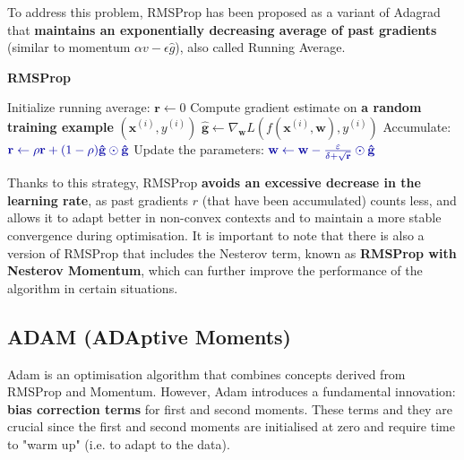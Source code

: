 To address this problem, RMSProp has been proposed as a variant of Adagrad that \textbf{maintains an exponentially decreasing average of past gradients} (similar to momentum $\alpha v -\epsilon\hat{g}$), also called Running Average.

\begin{algorithm}
\renewcommand\thealgorithm{}
\caption{\textbf{\textcolor{mygreen}{RMSProp}}}
\begin{algorithmic}[1]
\STATE Initialize running average: $\mathbf{r} \leftarrow 0$
\STATE Compute gradient estimate on \textbf{\textcolor{myred}{a random training example}} $(\mathbf{x}^{(i)}, y^{(i)})$
\STATE $\mathbf{\hat{g}} \leftarrow \nabla_{\mathbf{w}} L(f(\mathbf{x}^{(i)},\mathbf{w}), y^{(i)})$
\STATE Accumulate:
$\textcolor{mybluee}{\mathbf{r} \leftarrow \rho \mathbf{r} + (1 - \rho) \mathbf{\hat{g}} \odot \mathbf{\hat{g}}}$
\STATE Update the parameters:
$\textcolor{mybluee}{\mathbf{w} \leftarrow \mathbf{w} - \frac{\varepsilon}{\delta + \sqrt{\mathbf{r}}} \odot \mathbf{\hat{g}}}$
\ENDWHILE
\end{algorithmic}
\end{algorithm}

Thanks to this strategy, RMSProp \textbf{avoids an excessive decrease in the learning rate}, as past gradients $r$ (that have been accumulated) counts less, and allows it to adapt better in non-convex contexts and to maintain a more stable convergence during optimisation. It is important to note that there is also a version of RMSProp that includes the Nesterov term, known as \textbf{RMSProp with Nesterov Momentum}, which can further improve the performance of the algorithm in certain situations.


\subsection{ADAM (ADAptive Moments)}
Adam is an optimisation algorithm that combines concepts derived from RMSProp and Momentum.  However, Adam introduces a fundamental innovation: \textbf{bias correction terms} for first and second moments. These terms and they are crucial since the first and second moments are initialised at zero and require time to "warm up" (i.e. to adapt to the data).

